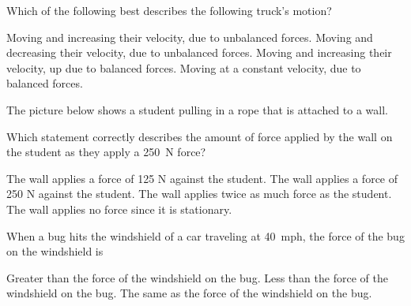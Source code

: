 \documentclass[answers]{exam}
\begin{document}
\begin{questions}
\question 
Which of the following best describes the following truck's motion?


\begin{center}
\end{center}

\begin{randomizechoices}
    \correctchoice Moving and increasing their velocity, due to unbalanced forces.
    \choice Moving and decreasing their velocity, due to unbalanced forces.
    \choice Moving and increasing their velocity, up due to balanced forces.
    \choice Moving at a constant velocity, due to balanced forces.
\end{randomizechoices}

\question 
The picture below shows a student pulling in a rope that is attached to a wall.

\begin{center}
\end{center}

Which statement correctly describes the amount of force applied by the wall on the student as they apply a \SI{250}{N} force?
    
\begin{randomizechoices}
    \choice The wall applies a force of 125 N against the student.
    \correctchoice The wall applies a force of 250 N against the student.
    \choice The wall applies twice as much force as the student.
    \choice The wall applies no force since it is stationary.
\end{randomizechoices}

\question 
When a bug hits the windshield of a car traveling at \SI{40}{mph}, the force of the bug on the windshield is

\begin{randomizechoices}
    \choice Greater than the force of the windshield on the bug.
    \choice Less than the force of the windshield on the bug.
    \correctchoice The same as the force of the windshield on the bug.
\end{randomizechoices}


\end{questions}
\end{document}
